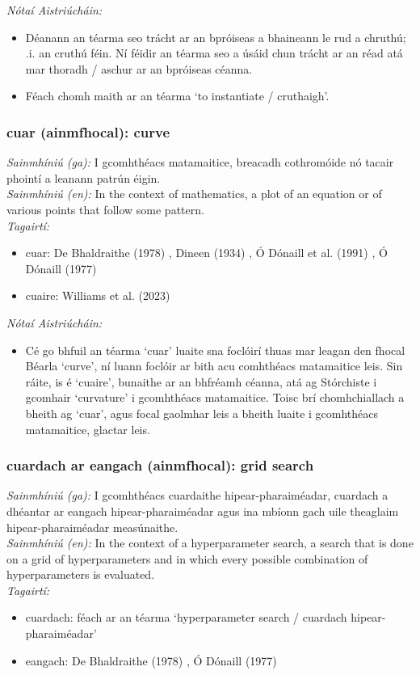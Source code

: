 \documentclass{article}
\begin{document}
 \noindent \textit{Nótaí Aistriúcháin:}
\begin{itemize}
	\item Déanann an téarma seo trácht ar an bpróiseas a bhaineann le rud a chruthú; .i. an cruthú féin. Ní féidir an téarma seo a úsáid chun trácht ar an réad atá mar thoradh / aschur ar an bpróiseas céanna.
	\item Féach chomh maith ar an téarma `to instantiate / cruthaigh'.
\end{itemize}


\subsubsection*{cuar (ainmfhocal): curve}
 \noindent \textit{Sainmhíniú (ga):} I gcomhthéacs matamaitice, breacadh cothromóide nó tacair phointí a leanann patrún éigin.
\\
 \noindent \textit{Sainmhíniú (en):} In the context of mathematics, a plot of an equation or of various points that follow some pattern.
\\
 \noindent \textit{Tagairtí:}
\begin{itemize}
	\item cuar: De Bhaldraithe (1978) \cite{de-bhaldraithe}, Dineen (1934) \cite{dineen}, Ó Dónaill et al. (1991) \cite{focloir-beag}, Ó Dónaill (1977) \cite{odonaill}
	\item cuaire: Williams et al. (2023) \cite{storchiste}
\end{itemize}

 \noindent \textit{Nótaí Aistriúcháin:}
\begin{itemize}
	\item Cé go bhfuil an téarma `cuar' luaite sna foclóirí thuas mar leagan den fhocal Béarla `curve', ní luann foclóir ar bith acu comhthéacs matamaitice leis. Sin ráite, is é `cuaire', bunaithe ar an bhfréamh céanna, atá ag Stórchiste i gcomhair `curvature' i gcomhthéacs matamaitice. Toisc brí chomhchiallach a bheith ag `cuar', agus focal gaolmhar leis a bheith luaite i gcomhthéacs matamaitice, glactar leis.
\end{itemize}


\subsubsection*{cuardach ar eangach (ainmfhocal): grid search}
 \noindent \textit{Sainmhíniú (ga):} I gcomhthéacs cuardaithe hipear-pharaiméadar, cuardach a dhéantar ar eangach hipear-pharaiméadar agus ina mbíonn gach uile theaglaim hipear-pharaiméadar measúnaithe.
\\
 \noindent \textit{Sainmhíniú (en):} In the context of a hyperparameter search, a search that is done on a grid of hyperparameters and in which every possible combination of hyperparameters is evaluated.
\\
 \noindent \textit{Tagairtí:}
\begin{itemize}
	\item cuardach: féach ar an téarma `hyperparameter search / cuardach hipear-pharaiméadar'
	\item eangach: De Bhaldraithe (1978) \cite{de-bhaldraithe}, Ó Dónaill (1977) \cite{odonaill}
\end{itemize}
\end{document}
